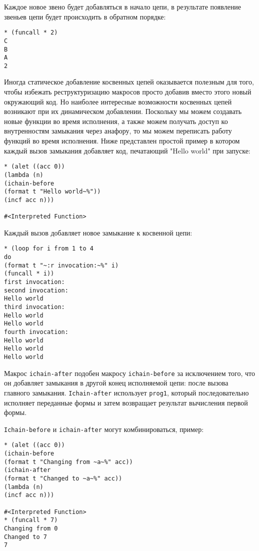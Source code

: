 Каждое новое звено будет добавляться в начало цепи, в результате появление звеньев цепи будет происходить в обратном порядке:

\begin{verbatim}
* (funcall * 2)
C
B
A
2
\end{verbatim}

Иногда статическое добавление косвенных цепей оказывается полезным для того, чтобы избежать реструктуризацию макросов просто добавив вместо этого новый окружающий код. Но наиболее интересные возможности косвенных цепей возникают при их динамическом добавлении. Поскольку мы можем создавать новые функции во время исполнения, а также можем получать доступ ко внутренностям замыкания через анафору, то мы можем переписать работу функций во время исполнения. Ниже представлен простой пример в котором каждый вызов замыкания добавляет код, печатающий "Hello world" при запуске:

\begin{verbatim}
* (alet ((acc 0))
(lambda (n)
(ichain-before
(format t "Hello world~%"))
(incf acc n)))

#<Interpreted Function>
\end{verbatim}

Каждый вызов добавляет новое замыкание к косвенной цепи:

\begin{verbatim}
* (loop for i from 1 to 4
do
(format t "~:r invocation:~%" i)
(funcall * i))
first invocation:
second invocation:
Hello world
third invocation:
Hello world
Hello world
fourth invocation:
Hello world
Hello world
Hello world
\end{verbatim}

Макрос \verb"ichain-after" подобен макросу \verb"ichain-before" за исключением того, что он добавляет замыкания в другой конец исполняемой цепи: после вызова главного замыкания. \verb"Ichain-after" использует \verb"prog1", который последовательно исполняет переданные формы и затем возвращает результат вычисления первой формы.

\verb"Ichain-before" и \verb"ichain-after" могут комбинироваться, пример:

\begin{verbatim}
* (alet ((acc 0))
(ichain-before
(format t "Changing from ~a~%" acc))
(ichain-after
(format t "Changed to ~a~%" acc))
(lambda (n)
(incf acc n)))

#<Interpreted Function>
* (funcall * 7)
Changing from 0
Changed to 7
7
\end{verbatim}

